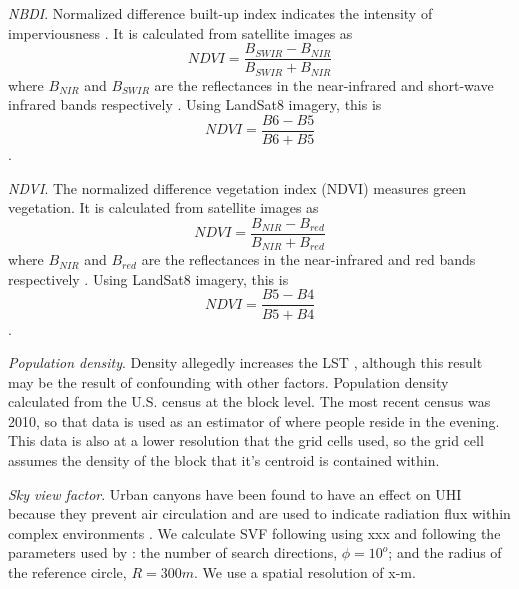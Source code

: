 \documentclass[final,3p,times,twocolumn,sort&compress]{elsarticle}
\begin{document}
\textit{NBDI}. Normalized difference built-up index indicates the intensity of imperviousness \cite{Bhatti2014-ae}. It is calculated from satellite images as $$NDVI=\frac{B_{SWIR}-B_{NIR}}{B_{SWIR}+B_{NIR}}$$ where $B_{NIR}$ and $B_{SWIR}$ are the reflectances in the near-infrared and short-wave infrared bands respectively \cite{Alhawiti2016-wv}. Using LandSat8 imagery, this is $$NDVI=\frac{B6-B5}{B6+B5}$$ \cite{barsi2014}.

\textit{NDVI}. The normalized difference vegetation index (NDVI) measures green vegetation. It is calculated from satellite images as $$NDVI=\frac{B_{NIR}-B_{red}}{B_{NIR}+B_{red}}$$ where $B_{NIR}$ and $B_{red}$ are the reflectances in the near-infrared and red bands respectively \cite{Alhawiti2016-wv}. Using LandSat8 imagery, this is $$NDVI=\frac{B5-B4}{B5+B4}$$ \cite{barsi2014}.


\textit{Population density}. Density allegedly increases the LST \cite{Li2017-yl}, although this result may be the result of confounding with other factors. Population density calculated from the U.S. census at the block level. The most recent census was 2010, so that data is used as an estimator of where people reside in the evening. This data is also at a lower resolution that the grid cells used, so the grid cell assumes the density of the block that it's centroid is contained within.

\textit{Sky view factor}. Urban canyons have been found to have an effect on UHI because they prevent air circulation \cite{Landsberg1981-mq, Chun2017-mm} and are used to indicate radiation flux within complex environments \cite{Matzarakis2007-xy}. We calculate SVF following using xxx and following the parameters used by \cite{Chun2017-mm}: the number of search directions, $\phi=10^o$; and the radius of the reference circle, $R=300m$. We use a spatial resolution of x-m.
\end{document}
